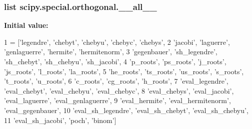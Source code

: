 \subsubsection[{\+\_\+\+\_\+all\+\_\+\+\_\+}]{\setlength{\rightskip}{0pt plus 5cm}list scipy.\+special.\+orthogonal.\+\_\+\+\_\+all\+\_\+\+\_\+}\label{namespacescipy_1_1special_1_1orthogonal_a11f33dd7d170fb7bd22ec5e9b680737e}
{\bfseries Initial value\+:}
\begin{DoxyCode}
1 = [\textcolor{stringliteral}{'legendre'}, \textcolor{stringliteral}{'chebyt'}, \textcolor{stringliteral}{'chebyu'}, \textcolor{stringliteral}{'chebyc'}, \textcolor{stringliteral}{'chebys'},
2            \textcolor{stringliteral}{'jacobi'}, \textcolor{stringliteral}{'laguerre'}, \textcolor{stringliteral}{'genlaguerre'}, \textcolor{stringliteral}{'hermite'}, \textcolor{stringliteral}{'hermitenorm'},
3            \textcolor{stringliteral}{'gegenbauer'}, \textcolor{stringliteral}{'sh\_legendre'}, \textcolor{stringliteral}{'sh\_chebyt'}, \textcolor{stringliteral}{'sh\_chebyu'}, \textcolor{stringliteral}{'sh\_jacobi'},
4            \textcolor{stringliteral}{'p\_roots'}, \textcolor{stringliteral}{'ps\_roots'}, \textcolor{stringliteral}{'j\_roots'}, \textcolor{stringliteral}{'js\_roots'}, \textcolor{stringliteral}{'l\_roots'}, \textcolor{stringliteral}{'la\_roots'},
5            \textcolor{stringliteral}{'he\_roots'}, \textcolor{stringliteral}{'ts\_roots'}, \textcolor{stringliteral}{'us\_roots'}, \textcolor{stringliteral}{'s\_roots'}, \textcolor{stringliteral}{'t\_roots'}, \textcolor{stringliteral}{'u\_roots'},
6            \textcolor{stringliteral}{'c\_roots'}, \textcolor{stringliteral}{'cg\_roots'}, \textcolor{stringliteral}{'h\_roots'},
7            \textcolor{stringliteral}{'eval\_legendre'}, \textcolor{stringliteral}{'eval\_chebyt'}, \textcolor{stringliteral}{'eval\_chebyu'}, \textcolor{stringliteral}{'eval\_chebyc'},
8            \textcolor{stringliteral}{'eval\_chebys'}, \textcolor{stringliteral}{'eval\_jacobi'}, \textcolor{stringliteral}{'eval\_laguerre'}, \textcolor{stringliteral}{'eval\_genlaguerre'},
9            \textcolor{stringliteral}{'eval\_hermite'}, \textcolor{stringliteral}{'eval\_hermitenorm'}, \textcolor{stringliteral}{'eval\_gegenbauer'},
10            \textcolor{stringliteral}{'eval\_sh\_legendre'}, \textcolor{stringliteral}{'eval\_sh\_chebyt'}, \textcolor{stringliteral}{'eval\_sh\_chebyu'},
11            \textcolor{stringliteral}{'eval\_sh\_jacobi'}, \textcolor{stringliteral}{'poch'}, \textcolor{stringliteral}{'binom'}]
\end{DoxyCode}
\hypertarget{namespacescipy_1_1special_1_1orthogonal_a0707e7338dde8894a90572ddac5e10e1}{}
